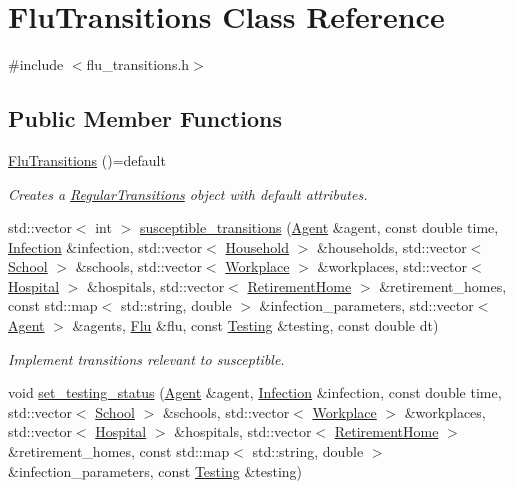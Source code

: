 \hypertarget{classFluTransitions}{}\section{Flu\+Transitions Class Reference}
\label{classFluTransitions}


{\ttfamily \#include $<$flu\+\_\+transitions.\+h$>$}

\subsection*{Public Member Functions}
\begin{DoxyCompactItemize}
\item 
\hyperlink{classFluTransitions_a6874addfb6b3cfbf1161fe6d5bc7be16}{Flu\+Transitions} ()=default
\begin{DoxyCompactList}\small\item\em Creates a \hyperlink{classRegularTransitions}{Regular\+Transitions} object with default attributes. \end{DoxyCompactList}\item 
std\+::vector$<$ int $>$ \hyperlink{classFluTransitions_a1e195475810b983e2d669fdd04aa5590}{susceptible\+\_\+transitions} (\hyperlink{classAgent}{Agent} \&agent, const double time, \hyperlink{classInfection}{Infection} \&infection, std\+::vector$<$ \hyperlink{classHousehold}{Household} $>$ \&households, std\+::vector$<$ \hyperlink{classSchool}{School} $>$ \&schools, std\+::vector$<$ \hyperlink{classWorkplace}{Workplace} $>$ \&workplaces, std\+::vector$<$ \hyperlink{classHospital}{Hospital} $>$ \&hospitals, std\+::vector$<$ \hyperlink{classRetirementHome}{Retirement\+Home} $>$ \&retirement\+\_\+homes, const std\+::map$<$ std\+::string, double $>$ \&infection\+\_\+parameters, std\+::vector$<$ \hyperlink{classAgent}{Agent} $>$ \&agents, \hyperlink{classFlu}{Flu} \&flu, const \hyperlink{classTesting}{Testing} \&testing, const double dt)
\begin{DoxyCompactList}\small\item\em Implement transitions relevant to susceptible. \end{DoxyCompactList}\item 
void \hyperlink{classFluTransitions_afc03327751ab451fff24c4d6a499f09f}{set\+\_\+testing\+\_\+status} (\hyperlink{classAgent}{Agent} \&agent, \hyperlink{classInfection}{Infection} \&infection, const double time, std\+::vector$<$ \hyperlink{classSchool}{School} $>$ \&schools, std\+::vector$<$ \hyperlink{classWorkplace}{Workplace} $>$ \&workplaces, std\+::vector$<$ \hyperlink{classHospital}{Hospital} $>$ \&hospitals, std\+::vector$<$ \hyperlink{classRetirementHome}{Retirement\+Home} $>$ \&retirement\+\_\+homes, const std\+::map$<$ std\+::string, double $>$ \&infection\+\_\+parameters, const \hyperlink{classTesting}{Testing} \&testing)

\end{DoxyCompactItemize}
